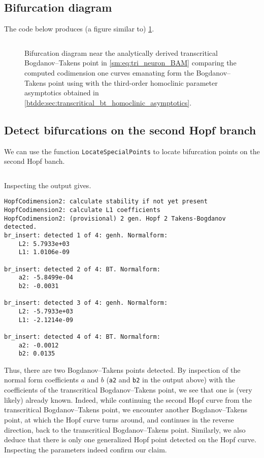 \subsection{Bifurcation diagram}
The code below produces (a figure similar to) \cref{sm:fig:triNeuronBAMNeuralNetworkModelCompareParametersSupplementI}.
\inputminted[firstline=148, lastline=175]{MATLAB}{\pathToDDEBifToolDemos/BAM_neural_network_model/BAMnn.m}
%
\begin{figure}[ht]
\caption{Bifurcation diagram near the analytically derived transcritical
    Bogdanov--Takens point in \cref{sm:eq:tri_neuron_BAM} comparing the
    computed codimension one curves emanating form the Bogdanov--Takens point
    using \DDEBIFTOOL with the third-order homoclinic parameter asymptotics
    obtained in \cref{btdde:sec:transcritical_bt_homoclinic_asymptotics}.}
\label{sm:fig:triNeuronBAMNeuralNetworkModelCompareParametersSupplementI}
\end{figure}

\subsection{Detect bifurcations on the second Hopf branch}
We can use the \DDEBIFTOOL function \texttt{LocateSpecialPoints} to
locate bifurcation points on the second Hopf banch.
\inputminted[firstline=177, lastline=178]{MATLAB}{\pathToDDEBifToolDemos/BAM_neural_network_model/BAMnn.m}

Inspecting the \MATLAB output gives.
\begin{verbatim}
HopfCodimension2: calculate stability if not yet present
HopfCodimension2: calculate L1 coefficients
HopfCodimension2: (provisional) 2 gen. Hopf 2 Takens-Bogdanov  detected.
br_insert: detected 1 of 4: genh. Normalform:
    L2: 5.7933e+03
    L1: 1.0106e-09

br_insert: detected 2 of 4: BT. Normalform:
    a2: -5.8499e-04
    b2: -0.0031

br_insert: detected 3 of 4: genh. Normalform:
    L2: -5.7933e+03
    L1: -2.1214e-09

br_insert: detected 4 of 4: BT. Normalform:
    a2: -0.0012
    b2: 0.0135
\end{verbatim}
Thus, there are two Bogdanov--Takens points detected. By inspection of the normal
form coefficients $a$ and $b$ (\texttt{a2} and
\texttt{b2} in the output above) with the coefficients of the
transcritical Bogdanov--Takens point, we see that one is (very likely) already
known. Indeed, while continuing the second Hopf curve from the transcritical
Bogdanov--Takens point, we encounter another Bogdanov--Takens point, at which
the Hopf curve turns around, and continues in the reverse direction, back to
the transcritical Bogdanov--Takens point. Similarly, we also deduce that there
is only one generalized Hopf point detected on the Hopf curve. Inspecting 
the parameters indeed confirm our claim.

